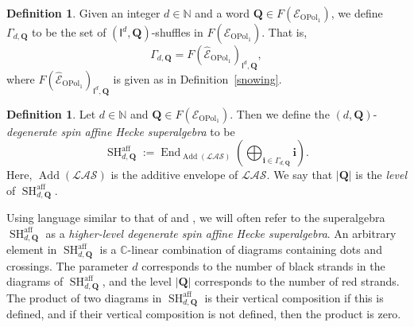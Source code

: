 \documentclass[11pt]{amsart}
\newcommand\go{\mathsf{I}}              %
\theoremstyle{definition}
\newtheorem{defn}[theo]{Definition}
\numberwithin{equation}{section}
\begin{document}
\begin{defn} \label{fluffy_spin}
Given an integer $ d \in \mathbb{N} $ and a word $ \mathbf{Q} \in F(\mathcal{E}_{\operatorname{OPol}_{1}}) $, we define $ \Gamma_{d,\mathbf{Q}} $ to be the set of $ (\go^{d},\mathbf{Q}) $-shuffles in $ F(\widehat{\mathcal{E}}_{\operatorname{OPol}_{1}}) $. That is, 
\begin{equation} \label{fluffy_5678}
\Gamma_{d,\mathbf{Q}} = F(\widehat{\mathcal{E}}_{\operatorname{OPol}_{1}})_{\go^{d},\mathbf{Q}},
\end{equation}
where $ F(\widehat{\mathcal{E}}_{\operatorname{OPol}_{1}})_{\go^{d},\mathbf{Q}} $ is given as in Definition~\ref{snowing}. 
\end{defn}


\begin{defn} \label{HLDSAHA}
Let $ d \in \mathbb{N}$ and $ \mathbf{Q} \in F(\mathcal{E}_{\operatorname{OPol}_{1}}) $. Then we define the $ (d,\mathbf{Q}) $-\emph{degenerate spin affine Hecke superalgebra} to be 
\begin{equation} \label{HLDSAHA22}
\operatorname{SH}^{\operatorname{aff}}_{d,\mathbf{Q}} := \operatorname{End}_{\operatorname{Add}(\mathcal{LAS})}\left(\bigoplus_{\mathbf{i} \in \Gamma_{d,\mathbf{Q}}}\mathbf{i}\right).
\end{equation}
Here, $ \operatorname{Add}(\mathcal{LAS}) $ is the additive envelope of $ \mathcal{LAS} $. We say that $ |\mathbf{Q}| $ is the \emph{level} of $ \operatorname{SH}^{\operatorname{aff}}_{d,\mathbf{Q}} $.
\end{defn}

Using language similar to that of \cite{Maksimau-Stroppel} and \cite{Moran}, we will often refer to the superalgebra $ \operatorname{SH}^{\operatorname{aff}}_{d,\mathbf{Q}} $ as a \emph{higher-level degenerate spin affine Hecke superalgebra}. An arbitrary element in $ \operatorname{SH}^{\operatorname{aff}}_{d,\mathbf{Q}} $ is a $ \mathbb{C} $-linear combination of diagrams containing dots and crossings. The parameter \(d\) corresponds to the number of black strands in the diagrams of $ \operatorname{SH}^{\operatorname{aff}}_{d,\mathbf{Q}} $, and the level $ |\mathbf{Q}| $ corresponds to the number of red strands. The product of two diagrams in $ \operatorname{SH}^{\operatorname{aff}}_{d,\mathbf{Q}} $ is their vertical composition if this is defined, and if their vertical composition is not defined, then the product is zero.
\end{document}
